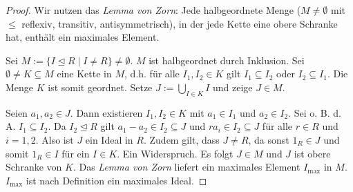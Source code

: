 \begin{proof}
	Wir nutzen das \textit{Lemma von Zorn}: Jede halbgeordnete Menge ($M \neq \emptyset$ mit $\leq$ reflexiv, transitiv, antisymmetrisch), in der jede Kette eine obere Schranke hat, enthält ein maximales Element.
	
	Sei $M := \{I \unlhd R \mid I \neq R\} \neq \emptyset$. $M$ ist halbgeordnet durch Inklusion. Sei $\emptyset \neq K \subseteq M$ eine Kette in $M$, d.h. für alle $I_1, I_2 \in K$ gilt $I_1 \subseteq I_2$ oder $I_2 \subseteq I_1$. Die Menge $K$ ist somit geordnet. Setze $ J := \bigcup_{I \in K} I$ und zeige $J \in M$.
	
	Seien $a_1, a_2 \in J$. Dann existieren $I_1, I_2 \in K$ mit $a_1 \in I_1$ und $a_2 \in I_2$. Sei o. B. d. A. $I_1 \subseteq I_2$. Da $I_2 \unlhd R$ gilt $a_1 - a_2 \in I_2 \subseteq J$ und $ra_i  \in I_2 \subseteq J$ für alle $r \in R$ und $i = 1,2$. Also ist $J$ ein Ideal in $R$. Zudem gilt, dass $J \neq R$, da sonst $1_R \in J$ und somit $1_R \in I$ für ein $I \in K$. Ein Widerspruch. Es folgt $J \in M$ und $J$ ist obere Schranke von $K$. Das \textit{Lemma von Zorn} liefert ein maximales Element $I_{\max}$ in $M$. $I_{\max}$ ist nach Definition ein maximales Ideal.
\end{proof}

